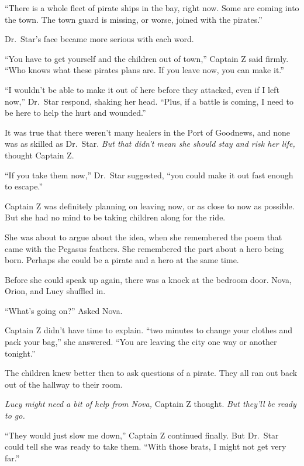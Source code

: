 \documentclass[12pt]{extbook}
\begin{document}
  \enquote{There is a whole fleet of pirate ships in the bay, right now.
  Some are coming into the town. The town guard is missing, or worse,
  joined with the pirates.}
  
  Dr.~Star's face became more serious with each word.
  
  \enquote{You have to get yourself and the children out of town,} Captain
  Z said firmly. \enquote{Who knows what these pirates plans are. If you
  leave now, you can make it.}
  
  \enquote{I wouldn't be able to make it out of here before they attacked,
  even if I left now,} Dr.~Star respond, shaking her head. \enquote{Plus,
  if a battle is coming, I need to be here to help the hurt and wounded.}
  
  It was true that there weren't many healers in the Port of Goodnews, and
  none was as skilled as Dr.~Star. \emph{But that didn't mean she should
  stay and risk her life,} thought Captain Z.
  
  \enquote{If you take them now,} Dr.~Star suggested, \enquote{you could
  make it out fast enough to escape.}
  
  Captain Z was definitely planning on leaving now, or as close to now as
  possible. But she had no mind to be taking children along for the ride.
  
  She was about to argue about the idea, when she remembered the poem that
  came with the Pegasus feathers. She remembered the part about a hero
  being born. Perhaps she could be a pirate and a hero at the same time.
  
  Before she could speak up again, there was a knock at the bedroom door.
  Nova, Orion, and Lucy shuffled in.
  
  \enquote{What's going on?} Asked Nova.
  
  Captain Z didn't have time to explain. \enquote{two minutes to change
  your clothes and pack your bag,} she answered. \enquote{You are leaving
  the city one way or another tonight.}
  
  The children knew better then to ask questions of a pirate. They all ran
  out back out of the hallway to their room.
  
  \emph{Lucy might need a bit of help from Nova,} Captain Z thought.
  \emph{But they'll be ready to go.}
  
  \enquote{They would just slow me down,} Captain Z continued finally. But
  Dr.~Star could tell she was ready to take them. \enquote{With those
  brats, I might not get very far.}
  
\end{document}

